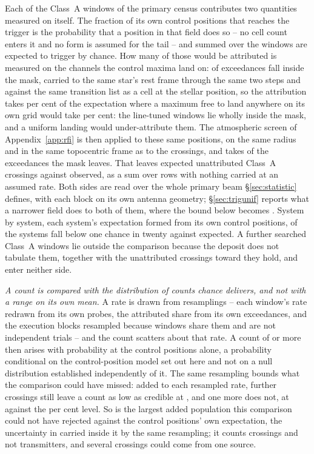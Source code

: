 Each of the \CeNWin{} Class~A windows of the primary census contributes two
quantities measured on itself. The fraction of its own \NCtrl{} control
positions that reaches the trigger is the probability that a position in that
field does so -- no cell count enters it and no form is assumed for the tail
-- and summed over the windows \CeExpTrig{} are expected to trigger by
chance. How many of those would be attributed is measured on the channels the
control maxima land on: \CeNExcAttr{} of \CeNExc{} exceedances fall inside
the mask, carried to the same star's rest frame through the same two steps
and against the same transition list as a cell at the stellar position, so
the attribution takes \CeMaskPct{} per cent of the expectation where a
maximum free to land anywhere on its own grid would take \CeUnifPct{} per
cent: the \CeNFullMask{} line-tuned windows lie wholly inside the mask, and a
uniform landing would under-attribute them. The atmospheric screen of
Appendix~\ref{app:rfi} is then applied to these same positions, on the same
radius and in the same topocentric frame as to the crossings, and takes
\CeTlCtrlCut{} of the \CeTlCtrlSurv{} exceedances the mask leaves. That
leaves \CeExp{} expected unattributed Class~A crossings against \CeObs{}
observed, as a sum over rows with nothing carried at an assumed rate. Both
sides are read over the whole primary beam \S\ref{sec:statistic} defines,
with each block on its own antenna geometry; \S\ref{sec:trigunif} reports
what a narrower field does to both of them, where the bound below becomes
\FrNarrowAddLim. System by system, each system's expectation formed from its
own control positions, \MtNSysLowP{} of the \MtNSysChance{} systems fall
below one chance in twenty against \MtNSysLowPExp{} expected. A further
\CeNWinTail{} searched Class~A windows lie outside the comparison because the
deposit does not tabulate them, together with the \CeNTailCrossWord{}
unattributed crossings toward \CeTailStar{} they hold, and enter neither
side.

\emph{A count is compared with the distribution of counts chance delivers,
and not with a range on its own mean.} A rate is drawn from \CeNBoot{}
resamplings -- each window's rate redrawn from its own \NCtrl{} probes, the
attributed share from its own \CeNExc{} exceedances, and the execution blocks
resampled because windows share them and are not independent trials -- and
the count scatters about that rate. A count of \CeObs{} or more then arises
with probability \CeProbNull{} at the control positions alone, a probability
conditional on the control-position model set out here and not on a null
distribution established independently of it. The same resampling bounds what
the comparison could have missed: added to each resampled rate, \CeAddLim{}
further crossings still leave a count as low as \CeObs{} credible at
\CeProbAtLim, and one more does not, at \CeProbAboveLim{} against the
\CeAlphaPct{} per cent level. So \CeAddLim{} is the largest added population
this comparison could not have rejected against the control positions' own
expectation, the uncertainty in \CeExp{} carried inside it by the same
resampling; it counts crossings and not transmitters, and several crossings
could come from one source.

